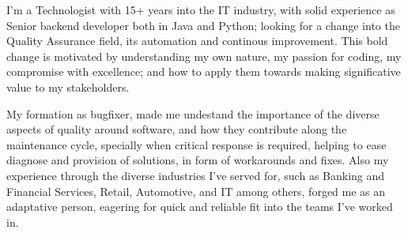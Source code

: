 

\begin{cvparagraph}

	I'm a Technologist with 15+ years into the IT industry, with solid experience as Senior backend developer both in Java and Python; looking for a change into the Quality Assurance field, its automation and continous improvement. This bold change is motivated by understanding my own nature, my passion for coding, my compromise with excellence; and how to apply them towards making significative value to my stakeholders.

	My formation as bugfixer, made me undestand the importance of the diverse aspects of quality around software, and how they contribute along the maintenance cycle,  specially when critical response is required, helping to ease diagnose and provision of solutions, in form of workarounds and fixes. Also my experience through the diverse industries I've served for, such as Banking and Financial Services, Retail, Automotive, and IT among others, forged me as an adaptative person, eagering for quick and reliable fit into the teams I've worked in.
\end{cvparagraph}
